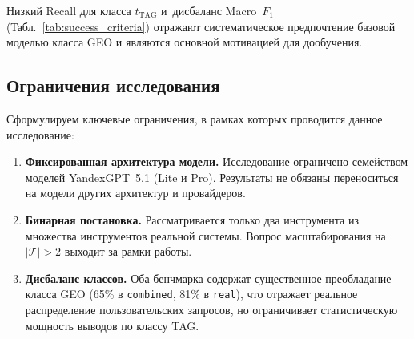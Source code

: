 Низкий Recall для класса $t_{\mathrm{TAG}}$ и~дисбаланс Macro~$F_1$ (Табл.~\ref{tab:success_criteria}) отражают систематическое предпочтение базовой моделью класса GEO и являются основной мотивацией для дообучения.

\subsection{Ограничения исследования}

Сформулируем ключевые ограничения, в рамках которых проводится данное исследование:
\begin{enumerate}
    \item \textbf{Фиксированная архитектура модели.} Исследование ограничено семейством моделей YandexGPT~5.1 (Lite и Pro). Результаты не обязаны переноситься на модели других архитектур и провайдеров.

    \item \textbf{Бинарная постановка.} Рассматривается только два инструмента из множества инструментов реальной системы. Вопрос масштабирования на $|\mathcal{T}| > 2$ выходит за рамки работы.

    \item \textbf{Дисбаланс классов.} Оба бенчмарка содержат существенное преобладание класса GEO (65\% в \texttt{combined}, 81\% в \texttt{real}), что отражает реальное распределение пользовательских запросов, но ограничивает статистическую мощность выводов по классу TAG.

\end{enumerate}
